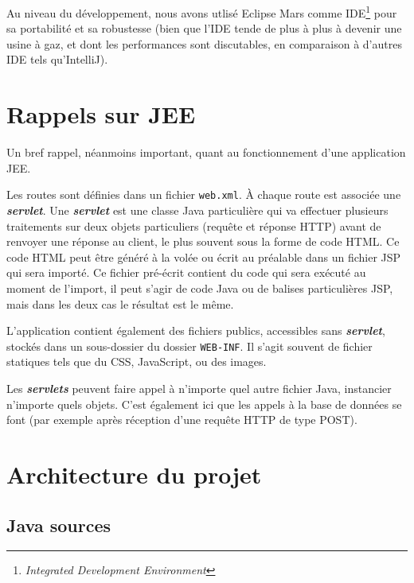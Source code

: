 \medskip

Au niveau du développement, nous avons utlisé Eclipse Mars comme IDE\footnote{\textit{Integrated Development Environment}} pour sa portabilité et sa robustesse (bien que l'IDE tende de plus à plus à devenir une usine à gaz, et dont les performances sont discutables, en comparaison à d'autres IDE tels qu'IntelliJ).

\section{Rappels sur JEE}

Un bref rappel, néanmoins important, quant au fonctionnement d'une application JEE.

\medskip

Les routes sont définies dans un fichier \lstinline{web.xml}. À chaque route est associée une \textbf{\textit{servlet}}. Une \textbf{\textit{servlet}} est une classe Java particulière qui va effectuer plusieurs traitements sur deux objets particuliers (requête et réponse HTTP) avant de renvoyer une réponse au client, le plus souvent sous la forme de code HTML. Ce code HTML peut être généré à la volée ou écrit au préalable dans un fichier JSP qui sera importé. Ce fichier pré-écrit contient du code qui sera exécuté au moment de l'import, il peut s'agir de code Java ou de balises particulières JSP, mais dans les deux cas le résultat est le même.

\medskip

L'application contient également des fichiers publics, accessibles sans \textbf{\textit{servlet}}, stockés dans un sous-dossier du dossier \lstinline{WEB-INF}. Il s'agit souvent de fichier statiques tels que du CSS, JavaScript, ou des images.

\medskip

Les \textbf{\textit{servlets}} peuvent faire appel à n'importe quel autre fichier Java, instancier n'importe quels objets. C'est également ici que les appels à la base de données se font (par exemple après réception d'une requête HTTP de type POST).

\section{Architecture du projet}

\subsection{Java sources}

